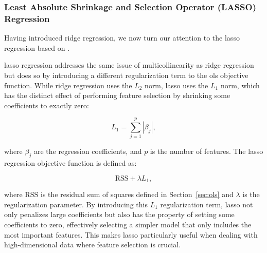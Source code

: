 \subsubsection{Least Absolute Shrinkage and Selection Operator (LASSO) Regression}
Having introduced ridge regression, we now turn our attention to the \gls{lasso} regression based on \citet{James2023AnIS}.

\gls{lasso} regression addresses the same issue of multicollinearity as ridge regression but does so by introducing a different regularization term to the \gls{ols} objective function.
While ridge regression uses the $L_2$ norm, \gls{lasso} uses the $L_1$ norm, which has the distinct effect of performing feature selection by shrinking some coefficients to exactly zero:

$$
L_1 = \sum_{j=1}^{p} |\beta_j|,
$$

where $\beta_j$ are the regression coefficients, and $p$ is the number of features.
The \gls{lasso} regression objective function is defined as:

$$
\text{RSS} + \lambda L_1,
$$

where $\text{RSS}$ is the residual sum of squares defined in Section~\ref{sec:ols} and $\lambda$ is the regularization parameter.
By introducing this $L_1$ regularization term, \gls{lasso} not only penalizes large coefficients but also has the property of setting some coefficients to zero, effectively selecting a simpler model that only includes the most important features.
This makes \gls{lasso} particularly useful when dealing with high-dimensional data where feature selection is crucial.